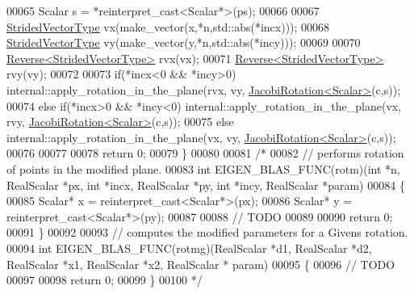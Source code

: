\begin{DoxyCode}
00065   Scalar s = *\textcolor{keyword}{reinterpret\_cast<}Scalar*\textcolor{keyword}{>}(ps);
00066 
00067   \hyperlink{group___core___module_class_eigen_1_1_map}{StridedVectorType} vx(make\_vector(x,*n,std::abs(*incx)));
00068   \hyperlink{group___core___module_class_eigen_1_1_map}{StridedVectorType} vy(make\_vector(y,*n,std::abs(*incy)));
00069 
00070   \hyperlink{group___core___module_class_eigen_1_1_reverse}{Reverse<StridedVectorType>} rvx(vx);
00071   \hyperlink{group___core___module_class_eigen_1_1_reverse}{Reverse<StridedVectorType>} rvy(vy);
00072 
00073        \textcolor{keywordflow}{if}(*incx<0 && *incy>0) internal::apply\_rotation\_in\_the\_plane(rvx, vy, 
      \hyperlink{group___jacobi___module_class_eigen_1_1_jacobi_rotation}{JacobiRotation<Scalar>}(c,s));
00074   \textcolor{keywordflow}{else} \textcolor{keywordflow}{if}(*incx>0 && *incy<0) internal::apply\_rotation\_in\_the\_plane(vx, rvy, 
      \hyperlink{group___jacobi___module_class_eigen_1_1_jacobi_rotation}{JacobiRotation<Scalar>}(c,s));
00075   \textcolor{keywordflow}{else}                        internal::apply\_rotation\_in\_the\_plane(vx, vy,  
      \hyperlink{group___jacobi___module_class_eigen_1_1_jacobi_rotation}{JacobiRotation<Scalar>}(c,s));
00076 
00077 
00078   \textcolor{keywordflow}{return} 0;
00079 \}
00080 
00081 \textcolor{comment}{/*}
00082 \textcolor{comment}{// performs rotation of points in the modified plane.}
00083 \textcolor{comment}{int EIGEN\_BLAS\_FUNC(rotm)(int *n, RealScalar *px, int *incx, RealScalar *py, int *incy, RealScalar *param)}
00084 \textcolor{comment}{\{}
00085 \textcolor{comment}{  Scalar* x = reinterpret\_cast<Scalar*>(px);}
00086 \textcolor{comment}{  Scalar* y = reinterpret\_cast<Scalar*>(py);}
00087 \textcolor{comment}{}
00088 \textcolor{comment}{  // TODO}
00089 \textcolor{comment}{}
00090 \textcolor{comment}{  return 0;}
00091 \textcolor{comment}{\}}
00092 \textcolor{comment}{}
00093 \textcolor{comment}{// computes the modified parameters for a Givens rotation.}
00094 \textcolor{comment}{int EIGEN\_BLAS\_FUNC(rotmg)(RealScalar *d1, RealScalar *d2, RealScalar *x1, RealScalar *x2, RealScalar *
      param)}
00095 \textcolor{comment}{\{}
00096 \textcolor{comment}{  // TODO}
00097 \textcolor{comment}{}
00098 \textcolor{comment}{  return 0;}
00099 \textcolor{comment}{\}}
00100 \textcolor{comment}{*/}
\end{DoxyCode}
